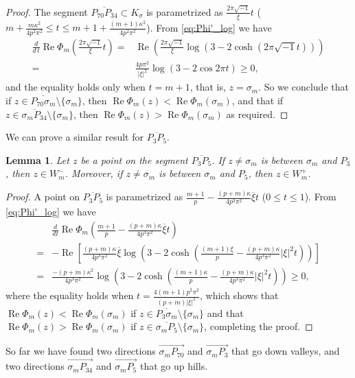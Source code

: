\documentclass[a4paper,dvipdfmx]{amsart}
\theoremstyle{plain}
\newtheorem{lem}[thm]{Lemma}
\theoremstyle{definition}
\theoremstyle{remark}
\renewcommand{\Re}{\operatorname{Re}}
\renewcommand{\i}{\sqrt{-1}}
\newcommand{\saddle}{\sigma}
\numberwithin{equation}{section}
\begin{document}
\begin{proof}
The segment $\overline{P_{70}P_{34}}\subset K_{\saddle}$ is parametrized as $\frac{2\pi\i}{\xi}t$ ($m+\frac{m\kappa^2}{4p^2\pi^2}\le t\le m+1+\frac{(m+1)\kappa^2}{4p^2\pi^2}$).
From \eqref{eq:Phi'_log} we have
\begin{align*}
  \frac{d}{d\,t}\Re\Phi_m\left(\frac{2\pi\i}{\xi}t\right)
  =&
  \Re\left(
    \frac{2\pi\i}{\xi}\log\left(3-2\cosh(2\pi\i t)\right)
  \right)
  \\
  =&
  \frac{4p\pi^2}{|\xi|^2}\log(3-2\cos{2\pi t})\ge0,
\end{align*}
and the equality holds only when $t=m+1$, that is, $z=\saddle_m$.
So we conclude that if $z\in\overline{P_{70}\saddle_m}\setminus\{\saddle_m\}$, then $\Re\Phi_m(z)<\Re\Phi_m(\saddle_m)$, and that if $z\in\overline{\saddle_m P_{34}}\setminus\{\saddle_m\}$, then $\Re\Phi_m(z)>\Re\Phi_m(\saddle_m)$ as required.
\end{proof}
We can prove a similar result for $\overline{P_3P_5}$.
\begin{lem}\label{lem:P3P5}
Let $z$ be a point on the segment $\overline{P_3P_5}$.
If $z\ne\saddle_m$ is between $\saddle_m$ and $P_{3}$, then $z\in W^{-}_m$.
Moreover, if $z\ne\saddle_m$ is between $\saddle_m$ and $P_{5}$, then $z\in{W}^{+}_m$.
\end{lem}
\begin{proof}
A point on $\overline{P_3P_5}$ is parametrized as $\frac{m+1}{p}-\frac{(p+m)\kappa}{4p^3\pi^2}\overline{\xi}t$ ($0\le t\le1$).
From \eqref{eq:Phi'_log} we have
\begin{align*}
  &\frac{d}{dt}\Re\Phi_m\left(\frac{m+1}{p}-\frac{(p+m)\kappa}{4p^3\pi^2}\overline{\xi}t\right)
  \\
  =&
  -\Re
  \left[
    \frac{(p+m)\kappa}{4p^3\pi^2}\overline{\xi}
    \log
    \left(
      3-2\cosh\left(\frac{(m+1)\xi}{p}-\frac{(p+m)\kappa}{4p^3\pi^2}|\xi|^2t\right)
    \right)
  \right]
  \\
  =&
  \frac{-(p+m)\kappa^2}{4p^3\pi^2}
  \log
  \left(
    3-2\cosh\left(\frac{(m+1)\kappa}{p}-\frac{(p+m)\kappa}{4p^3\pi^2}|\xi|^2t\right)
  \right)
  \ge0,
\end{align*}
where the equality holds when $t=\frac{4(m+1)p^2\pi^2}{(p+m)|\xi|^2}$, which shows that $\Re\Phi_m(z)<\Re\Phi_m(\saddle_m)$ if $z\in\overline{P_3\saddle_m}\setminus\{\saddle_m\}$ and that $\Re\Phi_m(z)>\Re\Phi_m(\saddle_m)$ if $z\in\overline{\saddle_mP_5}\setminus\{\saddle_m\}$, completing the proof.
\end{proof}
So far we have found two directions $\overrightarrow{\saddle_{m}P_{70}}$ and $\overrightarrow{\saddle_{m}P_{3}}$ that go down valleys, and two directions $\overrightarrow{\saddle_{m}P_{34}}$ and $\overrightarrow{\saddle_{m}P_{5}}$ that go up hills.
\end{document}
